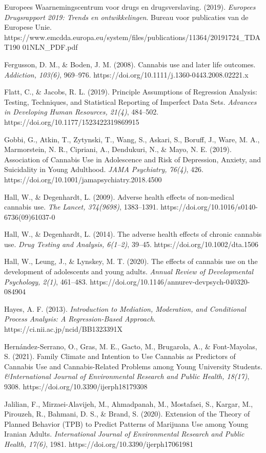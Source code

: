 \documentclass[
  letterpaper,
  DIV=11,
  numbers=noendperiod]{scrartcl}
\begin{document}
Europees Waarnemingscentrum voor drugs en drugsverslaving. (2019).
\emph{Europees Drugsrapport 2019: Trends en ontwikkelingen}. Bureau voor
publicaties van de Europese Unie.
https://www.emcdda.europa.eu/system/files/publications/11364/20191724\_TDAT190
01NLN\_PDF.pdf

Fergusson, D. M., \& Boden, J. M. (2008). Cannabis use and later life
outcomes. \emph{Addiction, 103(6)}, 969--976.
https://doi.org/10.1111/j.1360-0443.2008.02221.x

Flatt, C., \& Jacobs, R. L. (2019). Principle Assumptions of Regression
Analysis: Testing, Techniques, and Statistical Reporting of Imperfect
Data Sets. \emph{Advances in Developing Human Resources, 21(4)},
484--502. https://doi.org/10.1177/1523422319869915

Gobbi, G., Atkin, T., Zytynski, T., Wang, S., Askari, S., Boruff, J.,
Ware, M. A., Marmorstein, N. R., Cipriani, A., Dendukuri, N., \& Mayo,
N. E. (2019). Association of Cannabis Use in Adolescence and Risk of
Depression, Anxiety, and Suicidality in Young Adulthood. \emph{JAMA
Psychiatry, 76(4)}, 426.
https://doi.org/10.1001/jamapsychiatry.2018.4500

Hall, W., \& Degenhardt, L. (2009). Adverse health effects of
non-medical cannabis use. \emph{The Lancet, 374(9698)}, 1383--1391.
https://doi.org/10.1016/s0140-6736(09)61037-0

Hall, W., \& Degenhardt, L. (2014). The adverse health effects of
chronic cannabis use. \emph{Drug Testing and Analysis, 6(1--2)}, 39--45.
https://doi.org/10.1002/dta.1506

Hall, W., Leung, J., \& Lynskey, M. T. (2020). The effects of cannabis
use on the development of adolescents and young adults. \emph{Annual
Review of Developmental Psychology, 2(1)}, 461--483.
https://doi.org/10.1146/annurev-devpsych-040320-084904

Hayes, A. F. (2013). \emph{Introduction to Mediation, Moderation, and
Conditional Process Analysis: A Regression-Based Approach}.
https://ci.nii.ac.jp/ncid/BB1323391X

Hernández-Serrano, O., Gras, M. E., Gacto, M., Brugarola, A., \&
Font-Mayolas, S. (2021). Family Climate and Intention to Use Cannabis as
Predictors of Cannabis Use and Cannabis-Related Problems among Young
University Students. \emph{\&International Journal of Environmental
Research and Public Health, 18(17)}, 9308.
https://doi.org/10.3390/ijerph18179308

Jalilian, F., Mirzaei-Alavijeh, M., Ahmadpanah, M., Mostafaei, S.,
Kargar, M., Pirouzeh, R., Bahmani, D. S., \& Brand, S. (2020). Extension
of the Theory of Planned Behavior (TPB) to Predict Patterns of Marijuana
Use among Young Iranian Adults. \emph{International Journal of
Environmental Research and Public Health, 17(6)}, 1981.
https://doi.org/10.3390/ijerph17061981
\end{document}
